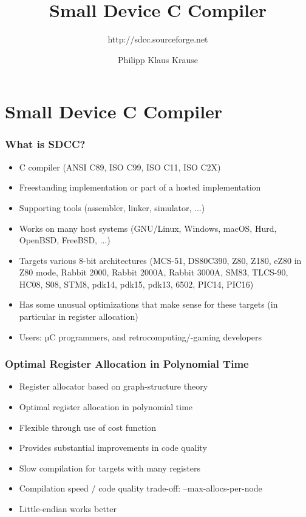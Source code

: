 \documentclass[xcolor=dvipsnames]{beamer}
\title{Small Device C Compiler}
\subtitle{http://sdcc.sourceforge.net}
\author{Philipp Klaus Krause}
\begin{document}
\begin{frame}
	\titlepage
\end{frame}

\section{Small Device C Compiler}

\begin{frame}
	\frametitle{What is SDCC?}
	\begin{itemize}
		\item C compiler (ANSI C89, ISO C99, ISO C11, ISO C2X)
		\item Freestanding implementation or part of a hosted implementation
		\item Supporting tools (assembler, linker, simulator, ...)
		\item Works on many host systems (GNU/Linux, Windows, macOS, Hurd, OpenBSD, FreeBSD, ...)
		\item Targets various 8-bit architectures (MCS-51, DS80C390, Z80, Z180, eZ80 in Z80 mode, Rabbit 2000, Rabbit 2000A, Rabbit 3000A, SM83, TLCS-90, HC08, S08, STM8, pdk14, pdk15, pdk13, 6502, PIC14, PIC16)
		\item Has some unusual optimizations that make sense for these targets (in particular in register allocation)
		\item Users: µC programmers, and retrocomputing/-gaming developers
	\end{itemize}
\end{frame}

\begin{frame}
	\frametitle{Optimal Register Allocation in Polynomial Time}
	\begin{itemize}
		\item Register allocator based on graph-structure theory
		\item Optimal register allocation in polynomial time
		\item Flexible through use of cost function
		\item Provides substantial improvements in code quality
		\item Slow compilation for targets with many registers
		\item Compilation speed / code quality trade-off: --max-allocs-per-node
		\item Little-endian works better
	\end{itemize}
\end{frame}
\end{document}
